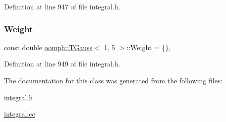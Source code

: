 Definition at line 947 of file integral.\+h.

\mbox{\label{classoomph_1_1TGauss_3_011_00_015_01_4_a6d954bc8909328f8081c27098b476657}} 
\subsubsection{\texorpdfstring{Weight}{Weight}}
{\footnotesize\ttfamily const double \hyperlink{classoomph_1_1TGauss}{oomph\+::\+T\+Gauss}$<$ 1, 5 $>$\+::Weight = \{\}\hspace{0.3cm}{\ttfamily [static]}, {\ttfamily [private]}}



Definition at line 949 of file integral.\+h.



The documentation for this class was generated from the following files\+:\begin{DoxyCompactItemize}
\item 
\hyperlink{integral_8h}{integral.\+h}\item 
\hyperlink{integral_8cc}{integral.\+cc}\end{DoxyCompactItemize}
